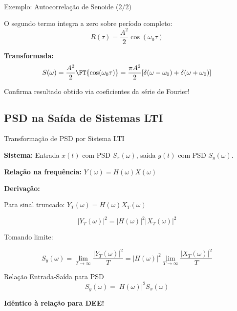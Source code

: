 
\begin{frame}{Exemplo: Autocorrelação de Senoide (2/2)}

O segundo termo integra a zero sobre período completo:
\[
R(\tau) = \frac{A^2}{2} \cos(\omega_0 \tau)
\]

\textbf{Transformada:}
\[
S(\omega) = \frac{A^2}{2} \FT{\cos(\omega_0 \tau)} = \frac{\pi A^2}{2}[\delta(\omega - \omega_0) + \delta(\omega + \omega_0)]
\]

Confirma resultado obtido via coeficientes da série de Fourier!

\end{frame}


\subsection{PSD na Saída de Sistemas LTI}

\begin{frame}{Transformação de PSD por Sistema LTI}

\textbf{Sistema:} Entrada $x(t)$ com PSD $S_x(\omega)$, saída $y(t)$ com PSD $S_y(\omega)$.

\textbf{Relação na frequência:} $Y(\omega) = H(\omega) X(\omega)$

\textbf{Derivação:}

Para sinal truncado: $Y_T(\omega) = H(\omega) X_T(\omega)$

\[
|Y_T(\omega)|^2 = |H(\omega)|^2 |X_T(\omega)|^2
\]

Tomando limite:

\[
S_y(\omega) = \lim_{T \to \infty} \frac{|Y_T(\omega)|^2}{T} = |H(\omega)|^2 \lim_{T \to \infty} \frac{|X_T(\omega)|^2}{T}
\]

\begin{block}{Relação Entrada-Saída para PSD}
\[
\boxed{S_y(\omega) = |H(\omega)|^2 S_x(\omega)}
\]
\end{block}

\textbf{Idêntico à relação para DEE!}

\end{frame}


